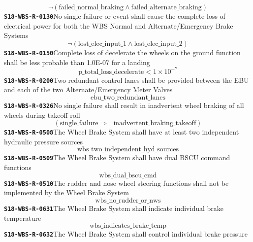 \documentclass[11pt,a4paper]{article}
\begin{document}
\begin{dmath*}
\neg (\text{failed\_normal\_braking} \wedge \text{failed\_alternate\_braking})
\end{dmath*}
\noindent\textbf{\texttt{S18-WBS-R-0130}}\quad No single failure or event shall cause the complete loss of electrical power for both the WBS Normal and Alternate/Emergency Brake Systems
\begin{dmath*}
\neg (\text{lost\_elec\_input\_1} \wedge \text{lost\_elec\_input\_2})
\end{dmath*}
\noindent\textbf{\texttt{S18-WBS-R-0150}}\quad Complete loss of decelerate the wheels on the ground function shall be less probable than 1.0E-07 for a landing
\begin{dmath*}
\text{p\_total\_loss\_decelerate} < 1 \times 10^{-7}
\end{dmath*}
\noindent\textbf{\texttt{S18-WBS-R-0200}}\quad Two redundant control lanes shall be provided between the EBU and each of the two Alternate/Emergency Meter Valves
\begin{dmath*}
\text{ebu\_two\_redundant\_lanes}
\end{dmath*}
\noindent\textbf{\texttt{S18-WBS-R-0326}}\quad No single failure shall result in inadvertent wheel braking of all wheels during takeoff roll
\begin{dmath*}
(\text{single\_failure} \Rightarrow \neg \text{inadvertent\_braking\_takeoff})
\end{dmath*}
\noindent\textbf{\texttt{S18-WBS-R-0508}}\quad The Wheel Brake System shall have at least two independent hydraulic pressure sources
\begin{dmath*}
\text{wbs\_two\_independent\_hyd\_sources}
\end{dmath*}
\noindent\textbf{\texttt{S18-WBS-R-0509}}\quad The Wheel Brake System shall have dual BSCU command functions
\begin{dmath*}
\text{wbs\_dual\_bscu\_cmd}
\end{dmath*}
\noindent\textbf{\texttt{S18-WBS-R-0510}}\quad The rudder and nose wheel steering functions shall not be implemented by the Wheel Brake System
\begin{dmath*}
\text{wbs\_no\_rudder\_or\_nws}
\end{dmath*}
\noindent\textbf{\texttt{S18-WBS-R-0631}}\quad The Wheel Brake System shall indicate individual brake temperature
\begin{dmath*}
\text{wbs\_indicates\_brake\_temp}
\end{dmath*}
\noindent\textbf{\texttt{S18-WBS-R-0632}}\quad The Wheel Brake System shall control individual brake pressure
\end{document}

